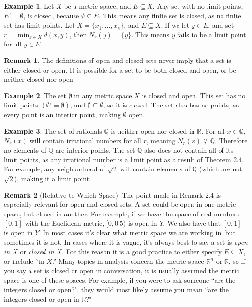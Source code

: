 \documentclass{article}
\newcommand{\R}{\mathbb{R}}
\newcommand{\Q}{\mathbb{Q}}
\theoremstyle{definition}
\newtheorem{example}{Example}[section]
\newtheorem{remark}{Remark}[section]
\begin{document}
\begin{example}
Let $ X $ be a metric space, and $ E\subseteq X $. Any set with no limit points, $ E'=\emptyset $, is closed, because $ \emptyset\subseteq E $. This means any finite set is closed, as no finite set has limit points. Let $ X=\{x_1,\ldots, x_n\} $, and $ E\subseteq X $. If we let $ y\in E $, and set $ r=\min_{x\in X}d(x,y) $, then $ N_r(y)=\{y\} $. This means $ y $ fails to be a limit point for all $ y\in E $.
\end{example}
\begin{remark}
	The definitions of open and closed sets never imply that a set is either closed or open. It is possible for a set to be both closed and open, or be neither closed nor open.
\end{remark}
\begin{example}
The set $ \emptyset $ in any metric space $ X $ is closed and open. This set has no limit points $ (\emptyset'=\emptyset) $, and $ \emptyset\subseteq\emptyset $, so it is closed. The set also has no points, so every point is an interior point, making $ \emptyset $ open. 
\end{example}
\begin{example}
The set of rationals $ \Q $ is neither open nor closed in $ \R $. For all $ x\in\Q $, $ N_r(x) $ will contain irrational numbers for all $ r $, meaning $ N_r(x)\not\subseteq\Q $. Therefore no elements of $ \Q $ are interior points. The set $ \Q $ also does not contain all of its limit points, as any irrational number is a limit point as a result of Theorem 2.4. For example, any neighborhood of $ \sqrt{2} $ will contain elements of $ \Q $ (which are not $ \sqrt{2} $), making it a limit point. 
\end{example}
\begin{remark}[Relative to Which Space]
	The point made in Remark 2.4 is especially relevant for open and closed sets. A set could be open in one metric space, but closed in another. For example, if we have the space of real numbers $ [0,1] $ with the Euclidean metric, $ [0,0.5) $ is open in $ Y $. We also have that $ [0,1] $ is open in $ Y $! In most cases it's clear what metric space we are working in, but sometimes it is not. In cases where it is vague, it's always best to say a set is \textit{open in $ X $} or \textit{closed in $ X $}. For this reason it is a good practice to either specify $ E\subseteq X $, or include ``in $ X $.'' Many topics in analysis concern the metric space $ \R^n $ or $ \R $, so if you say a set is closed or open in conversation, it is usually assumed the metric space is one of these spaces. For example, if you were to ask someone ``are the integers closed or open?", they would most likely assume you mean ``are the integers closed or open in $ \R $?" 
\end{remark}
\end{document}
